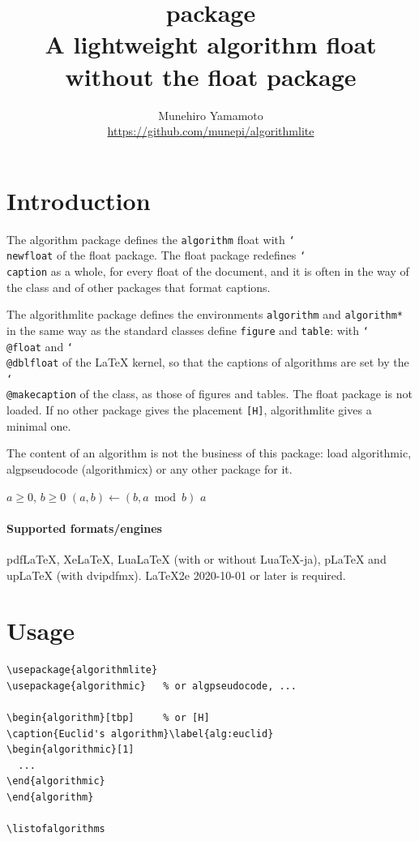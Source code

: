 \documentclass{article}
\title{\pkg{algorithmlite} package\\
  \large A lightweight algorithm float without the float package}
\author{Munehiro Yamamoto\\
  \url{https://github.com/munepi/algorithmlite}}
\date{\alversion}
\newcommand*\cs[1]{\texttt{\char`\\#1}}
\newcommand*\pkg[1]{\textsf{#1}}
\newcommand*\env[1]{\texttt{#1}}
\begin{document}
\maketitle

\section{Introduction}

The \pkg{algorithm} package defines the \env{algorithm} float with
\cs{newfloat} of the \pkg{float} package.  The \pkg{float} package
redefines \cs{caption} as a whole, for every float of the document,
and it is often in the way of the class and of other packages that
format captions.

The \pkg{algorithmlite} package defines the environments
\env{algorithm} and \env{algorithm*} in the same way as the standard
classes define \env{figure} and \env{table}: with \cs{@float} and
\cs{@dblfloat} of the \LaTeX{} kernel, so that the captions of
algorithms are set by the \cs{@makecaption} of the class, as those of
figures and tables.  The \pkg{float} package is not loaded.  If no
other package gives the placement \texttt{[H]}, \pkg{algorithmlite}
gives a minimal one.

The content of an algorithm is not the business of this package: load
\pkg{algorithmic}, \pkg{algpseudocode} (\pkg{algorithmicx}) or any
other package for it.

\begin{algorithm}[H]
\caption{Euclid's algorithm}\label{alg:euclid}
\begin{algorithmic}[1]
\REQUIRE $a \geq 0$, $b \geq 0$
  \STATE $(a, b) \leftarrow (b, a \bmod b)$
\ENDWHILE
\RETURN $a$
\end{algorithmic}
\end{algorithm}

\paragraph{Supported formats/engines}
pdf\LaTeX, Xe\LaTeX, Lua\LaTeX{} (with or without Lua\TeX-ja),
p\LaTeX{} and up\LaTeX{} (with dvipdfmx).  \LaTeX2e{} 2020-10-01 or
later is required.

\section{Usage}

\begin{verbatim}
\usepackage{algorithmlite}
\usepackage{algorithmic}   % or algpseudocode, ...

\begin{algorithm}[tbp]     % or [H]
\caption{Euclid's algorithm}\label{alg:euclid}
\begin{algorithmic}[1]
  ...
\end{algorithmic}
\end{algorithm}

\listofalgorithms
\end{verbatim}
\end{document}
